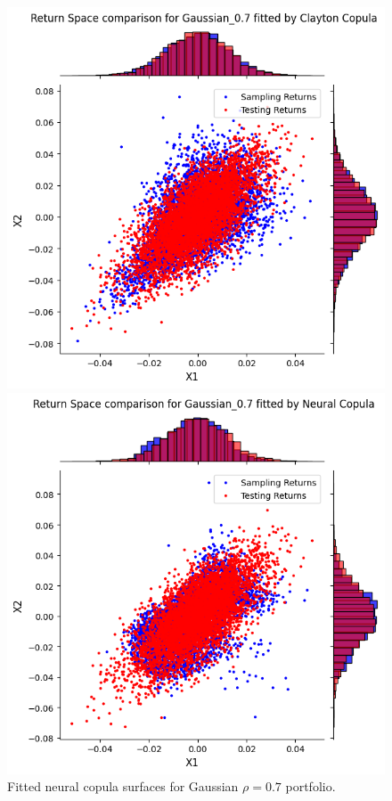 \documentclass[%
a4paper,							
11pt,								
bibliography=totoc,						
abstracton=true					
]
{scrartcl}
\theoremstyle{plain}
\theoremstyle{definition}
\theoremstyle{remark}
\newcommand{\1}{\mathbbm{1}}
\begin{document}
\begin{figure}[H]
\begin{minipage}{0.49\textwidth}
    \end{minipage}
    \vfill
    \begin{minipage}{0.49\textwidth}
        \centering
        \includegraphics[width=\textwidth]{5ResultsDiscussion/pictures/PortfolioTest/Port2Clayton.png}
    \end{minipage}
    \hfill
    \begin{minipage}{0.49\textwidth}
        \centering
        \includegraphics[width=\textwidth]{5ResultsDiscussion/pictures/PortfolioTest/Port2NC.png}
    \end{minipage}
    \caption{Fitted neural copula surfaces for Gaussian $\rho=0.7$ portfolio.}
    \label{fig:GeneratedDataGaussian07}
\end{figure}
\end{document}
